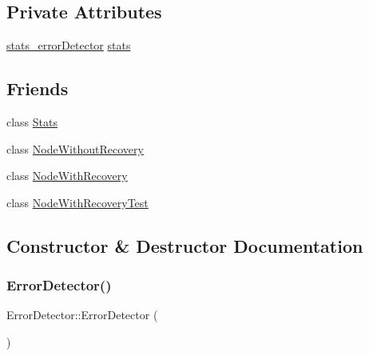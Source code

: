 \subsection*{Private Attributes}
\begin{DoxyCompactItemize}
\item 
\hyperlink{ErrorDetector_8h_abbc922e22c7b55f0bd58bea618eec587}{stats\+\_\+error\+Detector} \hyperlink{classErrorDetector_acb550f19c1da2d61d40757351f96d4b1}{stats}
\end{DoxyCompactItemize}
\subsection*{Friends}
\begin{DoxyCompactItemize}
\item 
class \hyperlink{classErrorDetector_a129f65b6976377739eb6231b6962985e}{Stats}
\item 
class \hyperlink{classErrorDetector_aa0495b79e94b09962892b921ae370e57}{Node\+Without\+Recovery}
\item 
class \hyperlink{classErrorDetector_af62fbc8632478613aa92b0e55c79510e}{Node\+With\+Recovery}
\item 
class \hyperlink{classErrorDetector_a4a759c82473f06c7e89c3d75a509a390}{Node\+With\+Recovery\+Test}
\end{DoxyCompactItemize}


\subsection{Constructor \& Destructor Documentation}
\mbox{\label{classErrorDetector_ae851a02dff242968cd6419400271d74f}} 
\subsubsection{\texorpdfstring{Error\+Detector()}{ErrorDetector()}}
{\footnotesize\ttfamily Error\+Detector\+::\+Error\+Detector (\begin{DoxyParamCaption}{ }\end{DoxyParamCaption})}

\mbox{\label{classErrorDetector_a3708d713f8f7bee01aa7e5a2fb7bb652}} 
